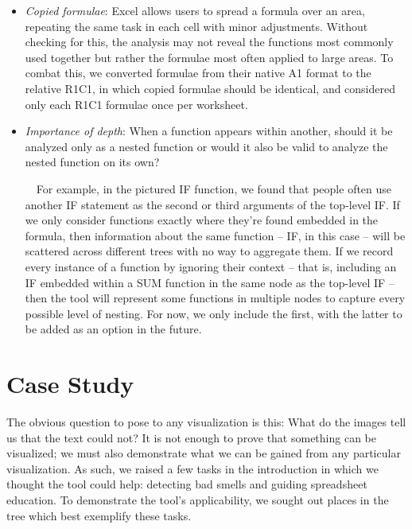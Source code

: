 \documentclass[conference]{IEEEtran}
\begin{document}
\begin{itemize}
		\item \textit{Copied formulae}: Excel allows users to spread a formula over an
		area, repeating the same task in each cell with minor adjustments. Without
		checking for this, the analysis may not reveal the functions most commonly
		used together but rather the formulae most often applied to large areas. To
		combat this, we converted formulae from their native A1 format to the relative
		R1C1, in which copied formulae should be identical, and considered only each
		R1C1 formulae once per worksheet.
		
		\item \textit{Importance of depth}: When a function appears within another,
		should it be analyzed only as a nested function or would it also be valid to
		analyze the nested function on its own? \par
		
		\ \ For example, in the pictured IF function, we found that people often use
		another IF statement as the second or third arguments of the top-level IF. If
		we only consider functions exactly where they're found embedded in the
		formula, then information about the same function -- IF, in this case -- will
		be scattered across different trees with no way to aggregate them. If we
		record every instance of a function by ignoring their context -- that is,
		including an IF embedded within a SUM function in the same node as the
		top-level IF -- then the tool will represent some functions in multiple nodes
		to capture every possible level of nesting. For now, we only include the
		first, with the latter to be added as an option in the future.
		
	\end{itemize}
	
	\section{Case Study} The obvious question to pose to any visualization is this:
	What do the images tell us that the text could not? It is not enough to prove
	that something can be visualized; we must also demonstrate what we can be
	gained from any particular visualization. As such, we raised a few tasks in the
	introduction in which we thought the tool could help: detecting bad smells and guiding spreadsheet education. To
	demonstrate the tool's applicability, we sought out places in the tree which
	best exemplify these tasks.
	
\end{document}
